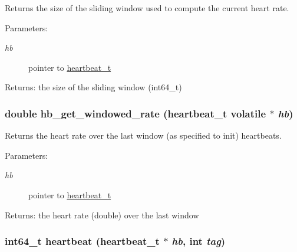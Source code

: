 Returns the size of the sliding window used to compute the current heart rate. 

\begin{Desc}
\item[Parameters:]
\begin{description}
\item[{\em hb}]pointer to \hyperlink{structheartbeat__t}{heartbeat\_\-t} \end{description}
\end{Desc}
\begin{Desc}
\item[Returns:]the size of the sliding window (int64\_\-t) \end{Desc}
\hypertarget{heartbeat-shared_8c_7afb09ea470be506247e69e874127be3}{
\subsubsection[hb\_\-get\_\-windowed\_\-rate]{\setlength{\rightskip}{0pt plus 5cm}double hb\_\-get\_\-windowed\_\-rate ({\bf heartbeat\_\-t} volatile $\ast$ {\em hb})}}
\label{heartbeat-shared_8c_7afb09ea470be506247e69e874127be3}


Returns the heart rate over the last window (as specified to init) heartbeats. 

\begin{Desc}
\item[Parameters:]
\begin{description}
\item[{\em hb}]pointer to \hyperlink{structheartbeat__t}{heartbeat\_\-t} \end{description}
\end{Desc}
\begin{Desc}
\item[Returns:]the heart rate (double) over the last window \end{Desc}
\hypertarget{heartbeat-shared_8c_83cee6dbfb8365b1595ef200f45fe6fc}{
\subsubsection[heartbeat]{\setlength{\rightskip}{0pt plus 5cm}int64\_\-t heartbeat ({\bf heartbeat\_\-t} $\ast$ {\em hb}, \/  int {\em tag})}}
\label{heartbeat-shared_8c_83cee6dbfb8365b1595ef200f45fe6fc}


